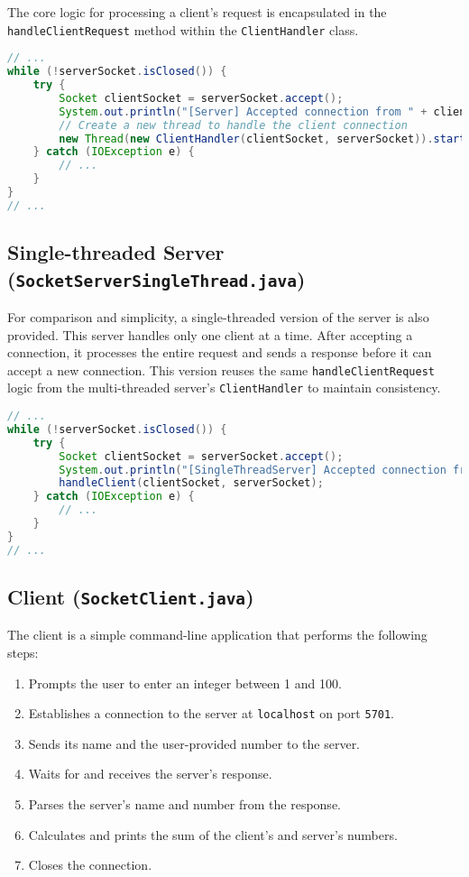 \documentclass{article}
\begin{document}
The core logic for processing a client's request is encapsulated in the \texttt{handleClientRequest} method within the \texttt{ClientHandler} class.

\begin{lstlisting}[language=Java, caption={SocketServer main loop for accepting connections}]
// ...
while (!serverSocket.isClosed()) {
    try {
        Socket clientSocket = serverSocket.accept();
        System.out.println("[Server] Accepted connection from " + clientSocket.getInetAddress());
        // Create a new thread to handle the client connection
        new Thread(new ClientHandler(clientSocket, serverSocket)).start();
    } catch (IOException e) {
        // ...
    }
}
// ...
\end{lstlisting}

\subsection{Single-threaded Server (\texttt{SocketServerSingleThread.java})}
For comparison and simplicity, a single-threaded version of the server is also provided. This server handles only one client at a time. After accepting a connection, it processes the entire request and sends a response before it can accept a new connection. This version reuses the same \texttt{handleClientRequest} logic from the multi-threaded server's \texttt{ClientHandler} to maintain consistency.

\begin{lstlisting}[language=Java, caption={SocketServerSingleThread main loop}]
// ...
while (!serverSocket.isClosed()) {
    try {
        Socket clientSocket = serverSocket.accept();
        System.out.println("[SingleThreadServer] Accepted connection from " + clientSocket.getInetAddress());
        handleClient(clientSocket, serverSocket);
    } catch (IOException e) {
        // ...
    }
}
// ...
\end{lstlisting}

\subsection{Client (\texttt{SocketClient.java})}
The client is a simple command-line application that performs the following steps:
\begin{enumerate}
    \item Prompts the user to enter an integer between 1 and 100.
    \item Establishes a connection to the server at \texttt{localhost} on port \texttt{5701}.
    \item Sends its name and the user-provided number to the server.
    \item Waits for and receives the server's response.
    \item Parses the server's name and number from the response.
    \item Calculates and prints the sum of the client's and server's numbers.
    \item Closes the connection.
\end{enumerate}
\end{document}

